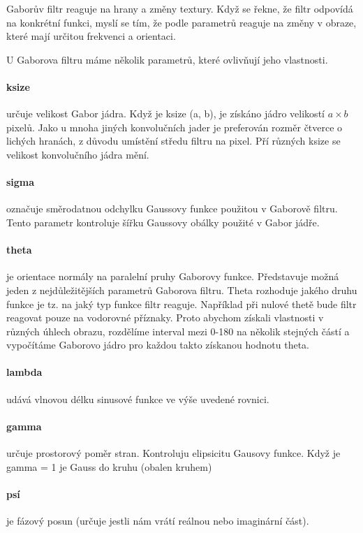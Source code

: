 \documentclass[czech,BP]{thesiskiv}
\begin{document}
\par Gaborův filtr reaguje na hrany a změny textury. Když se řekne, že filtr odpovídá na konkrétní funkci, myslí se tím, že podle parametrů reaguje na změny v obraze, které mají určitou frekvenci a orientaci. 

U Gaborova filtru máme několik parametrů, které ovlivňují jeho vlastnosti. 
\paragraph{ksize} určuje velikost Gabor jádra. Když je ksize (a, b), je získáno jádro velikostí $a \times b$ pixelů. Jako u mnoha jiných konvolučních jader je preferován rozměr čtverce o lichých hranách, z důvodu umístění středu filtru na pixel. Pří různých ksize se velikost konvolučního jádra mění. 

\paragraph{sigma} označuje směrodatnou odchylku Gaussovy funkce použitou v Gaborově filtru. Tento parametr kontroluje šířku Gaussovy obálky použité v Gabor jádře.

\paragraph{theta} je orientace normály na paralelní pruhy Gaborovy funkce. Představuje možná jeden z nejdůležitějších parametrů Gaborova filtru. Theta rozhoduje jakého druhu funkce je tz. na jaký typ funkce filtr reaguje. Například při nulové thetě bude filtr reagovat pouze na vodorovné příznaky. Proto abychom získali vlastnosti v různých úhlech obrazu, rozdělíme interval mezi 0-180 na několik stejných částí a vypočítáme Gaborovo jádro pro každou takto získanou hodnotu theta.

\paragraph{lambda} udává vlnovou délku sinusové funkce ve výše uvedené rovnici.

\paragraph{gamma} určuje prostorový poměr stran. Kontroluju elipsicitu Gausovy funkce. Když je gamma = 1 je Gauss do kruhu (obalen kruhem)

\paragraph{psí} je fázový posun (určuje jestli nám vrátí reálnou nebo imaginární část). \\ 
\end{document}
